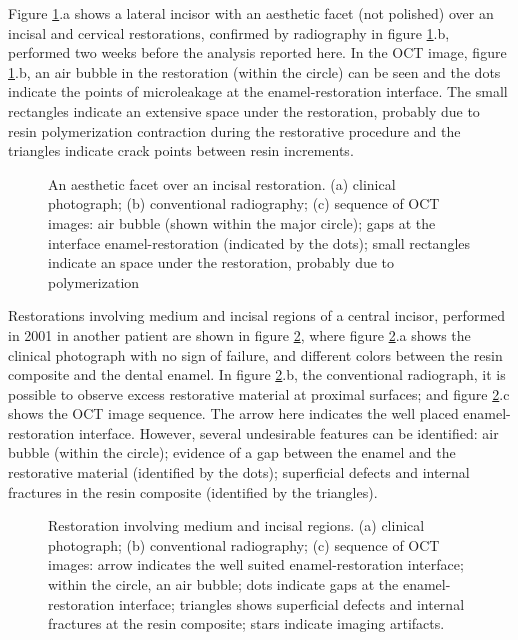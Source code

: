 \documentclass[12pt,twoside,english]{book}
\renewcommand{\~}{\perispomeni}%
\numberwithin{equation}{section}
\numberwithin{figure}{section}
\begin{document}
Figure \ref{fig:aesthetic}.a shows a lateral incisor with an aesthetic facet (not polished) over an incisal and cervical restorations, confirmed by radiography in figure \ref{fig:aesthetic}.b, performed two weeks before the analysis reported here. In the OCT image, figure \ref{fig:aesthetic}.b, an air bubble in the restoration (within the circle) can be seen and the dots indicate the points of microleakage at the enamel-restoration interface. The small rectangles indicate an extensive space under the restoration, probably due to resin polymerization contraction during the restorative procedure and the triangles indicate crack points between resin increments.
\begin{figure}[h]
\noindent \begin{centering}
\caption{An aesthetic facet over an incisal restoration. (a) clinical photograph; (b) conventional radiography; (c) sequence of OCT images: air bubble (shown within the major circle); gaps at the interface enamel-restoration (indicated by the dots); small rectangles indicate an space under the restoration, probably due to polymerization\label{fig:aesthetic}}
\par\end{centering}
\end{figure}

Restorations involving medium and incisal regions of a central incisor, performed in 2001 in another patient are shown in figure \ref{fig:medium region}, where figure \ref{fig:medium region}.a shows the clinical photograph with no sign of failure, and different colors between the resin composite and the dental enamel. In figure \ref{fig:medium region}.b, the conventional radiograph, it is possible to observe excess restorative material at proximal surfaces; and figure \ref{fig:medium region}.c shows the OCT image sequence. The arrow here indicates the well placed enamel-restoration interface. However, several undesirable features can be identified: air bubble (within the circle); evidence of a gap between the enamel and the restorative material (identified by the dots); superficial defects and internal fractures in the resin composite (identified by the triangles).
\begin{figure}[h]
\noindent \centering{}
\caption{Restoration involving medium and incisal regions. (a) clinical photograph; (b) conventional radiography; (c) sequence of OCT images: arrow indicates the well suited enamel-restoration interface; within the circle, an air bubble; dots indicate gaps at the enamel-restoration interface; triangles shows superficial defects and internal fractures at the resin composite; stars indicate imaging artifacts.\label{fig:medium region}}
\end{figure}
\end{document}
